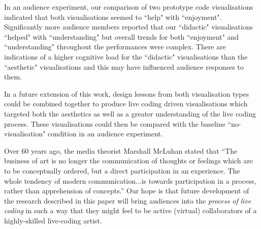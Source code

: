 \documentclass{sig-alternate}
\begin{document}
In an audience experiment, our comparison of two prototype code visualisations indicated that both visualisations seemed to ``help" with ``enjoyment". Significantly more audience members reported that our ``didactic" visualisations ``helped" with ``understanding" but overall trends for both ``enjoyment" and ``understanding" throughout the performances were complex. There are indications of a higher cognitive load for the ``didactic" visualisations than the ``aesthetic" visualisations and this may have influenced audience responses to them. 

In a future extension of this work, design lessons from both visualisation types could be combined together to produce live coding driven visualisations which targeted both the aesthetics as well as a greater understanding of the live coding process. These visualisations could then be compared with the baseline ``no-visualisation" condition in an audience experiment. 

Over 60 years ago, the media theorist Marshall McLuhan stated that ``The business of art is no longer the communication of thoughts or feelings which are to be conceptually ordered, but a direct participation in an experience. The whole tendency of modern communication...is towards participation in a process, rather than apprehension of concepts.'' \cite{McLuhan} Our hope is that future development of the research described in this paper will bring audiences into the \textit{process of live coding} in such a way that they might feel to be active (virtual) collaborators of a highly-skilled live-coding artist.


\end{document}
